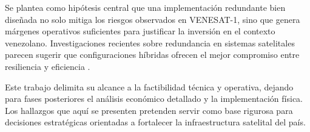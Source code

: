 Se plantea como hipótesis central que una implementación redundante bien diseñada no solo mitiga los riesgos observados en VENESAT-1, sino que genera márgenes operativos suficientes para justificar la inversión en el contexto venezolano. Investigaciones recientes sobre redundancia en sistemas satelitales parecen sugerir que configuraciones híbridas ofrecen el mejor compromiso entre resiliencia y eficiencia \cite{SatCommRedundancy2024}.

Este trabajo delimita su alcance a la factibilidad técnica y operativa, dejando para fases posteriores el análisis económico detallado y la implementación física. Los hallazgos que aquí se presenten pretenden servir como base rigurosa para decisiones estratégicas orientadas a fortalecer la infraestructura satelital del país.